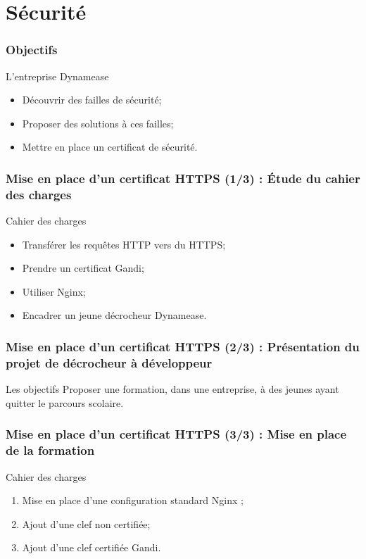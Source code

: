 \section{Sécurité}
\author{Kévin Moreau}


\begin{frame}
	\frametitle{Objectifs}

	\begin{block}{L'entreprise Dynamease}
	 \begin{itemize}
      \item Découvrir des failles de sécurité;
      \item Proposer des solutions à ces failles;
      \item Mettre en place un certificat de sécurité.
	 \end{itemize}
	\end{block}
\end{frame}

\begin{frame}
	\frametitle{Mise en place d'un certificat HTTPS (1/3) : Étude du cahier des charges}

	\begin{block}{Cahier des charges}
	 \begin{itemize}
      \item Transférer les requêtes HTTP vers du HTTPS;
      \item Prendre un certificat Gandi;
      \item Utiliser Nginx;
      \item Encadrer un jeune décrocheur Dynamease.
	 \end{itemize}
	\end{block}
\end{frame}

\begin{frame}
	\frametitle{Mise en place d'un certificat HTTPS (2/3) : Présentation du projet de décrocheur à développeur}

	\begin{block}{Les objectifs}
	 Proposer une formation, dans une entreprise, à des jeunes ayant quitter le parcours scolaire.
	\end{block}
\end{frame}

\begin{frame}
	\frametitle{Mise en place d'un certificat HTTPS (3/3) : Mise en place de la formation}

	\begin{block}{Cahier des charges}
	 \begin{enumerate}
      \item Mise en place d'une configuration standard Nginx ;
	  \item Ajout d'une clef non certifiée;
	  \item Ajout d'une clef certifiée Gandi. 
	 \end{enumerate}
	\end{block}
\end{frame}

